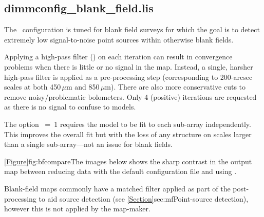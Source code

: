\subsection{dimmconfig\_blank\_field.lis}

The \blankfield\ configuration is tuned for blank field surveys for which the goal
is to detect extremely low signal-to-noise point sources within otherwise
blank fields.

Applying a high-pass filter () on each iteration can result in
convergence problems when there is little or no signal in the
map. Instead, a single, harsher high-pass filter is applied as a
pre-processing step (corresponding to 200-arcsec scales at both
450\,$\mu$m and 850\,$\mu$m). There are also more conservative cuts to
remove noisy/problematic bolometers. Only 4 (positive) iterations are
requested as there is no signal to confuse to models.

The option ~=~1 requires the  model to
be fit to each sub-array independently. This improves the overall fit
but with the loss of any structure on scales larger than a single
sub-array---not an issue for blank fields.

\cref{Figure}{fig:bfcompare}{The images below} shows the sharp
contrast in the output map between reducing data with the default
configuration file and using .

Blank-field maps commonly have a matched filter applied as part of the
post-processing to aid source detection (see
\cref{Section}{sec:mf}{Point-source detection}), however this is not
applied by the map-maker.

